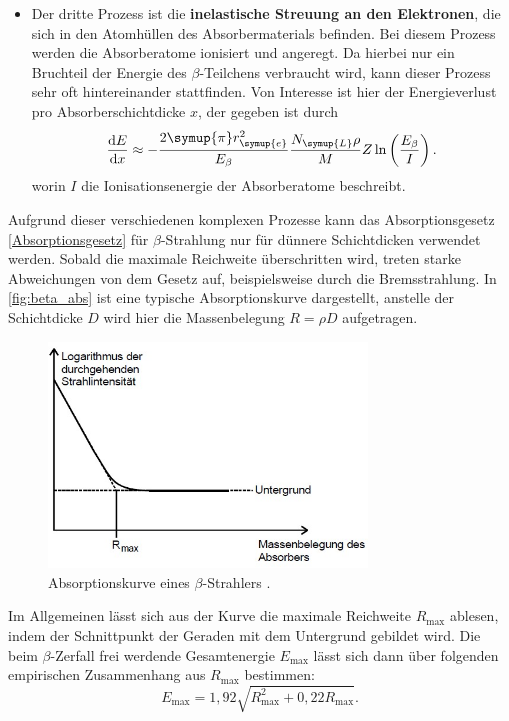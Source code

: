 \begin{itemize}
    \item Der dritte Prozess ist die \textbf{inelastische Streuung an den Elektronen}, die sich in den Atomhüllen des
    Absorbermaterials befinden. Bei diesem Prozess werden die Absorberatome ionisiert und angeregt.
    Da hierbei nur ein Bruchteil der Energie des $\beta$-Teilchens verbraucht wird, kann dieser Prozess sehr oft
    hintereinander stattfinden.
    Von Interesse ist hier der Energieverlust pro Absorberschichtdicke $x$, der gegeben ist durch
    \begin{equation}
        \label{dEdx}
        \frac{\text{d}E}{\text{d}x} \approx -\frac{2 \symup{\pi} r_{\symup{e}}^2}{E_\beta}\frac{N_{\symup{L}}\rho}{M} Z \ln\left(\frac{E_\beta}{I}\right).
    \end{equation}
    worin $I$ die Ionisationsenergie der Absorberatome beschreibt.
\end{itemize}

Aufgrund dieser verschiedenen komplexen Prozesse kann das Absorptionsgesetz \eqref{Absorptionsgesetz} für $\beta$-Strahlung
nur für dünnere Schichtdicken verwendet werden.
Sobald die maximale Reichweite überschritten wird, treten starke Abweichungen von dem Gesetz auf, beispielsweise
durch die Bremsstrahlung.
In \autoref{fig:beta_abs} ist eine typische Absorptionskurve dargestellt, anstelle der Schichtdicke $D$ wird hier
die Massenbelegung $R=\rho D$ aufgetragen.
\begin{figure}[H]
    \centering
    \includegraphics[height=6cm]{content/pics/beta_absorption.jpg}
    \caption{Absorptionskurve eines $\beta$-Strahlers \cite{v704}.}
    \label{fig:beta_abs}
\end{figure}
Im Allgemeinen lässt sich aus der Kurve die maximale Reichweite $R_{\text{max}}$ ablesen, indem der Schnittpunkt
der Geraden mit dem Untergrund gebildet wird.
Die beim $\beta$-Zerfall frei werdende Gesamtenergie $E_{\text{max}}$ lässt sich dann über folgenden empirischen
Zusammenhang aus $R_{\text{max}}$ bestimmen:
\begin{equation}
    \label{e_max}
    E_{\text{max}} = 1,92\sqrt{R_{\text{max}}^2 + 0,22R_{\text{max}}}.
\end{equation}

